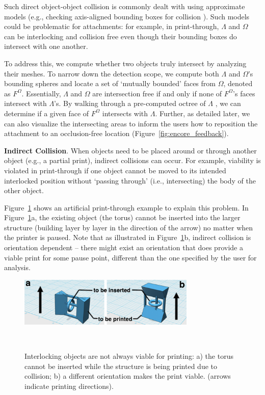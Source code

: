 Such direct object-object collision is commonly dealt with using approximate models (e.g., checking axis-aligned bounding boxes for collision \cite{bergen1997efficient}). Such models could be problematic for attachments: for example, in print-through, $\Lambda$ and $\Omega$ can be interlocking and collision free even though their bounding boxes do intersect with one another.

To address this, we compute whether two objects truly intersect by analyzing their meshes. To narrow down the detection scope, we compute both $\Lambda$ and $\Omega$'s bounding spheres and locate a set of ‘mutually bounded' faces from $\Omega$, denoted as $F^\Omega$. Essentially, $\Lambda$ and $\Omega$ are intersection free if and only if none of $F^\Omega$'s faces intersect with $\Lambda$'s. By walking through a pre-computed octree of $\Lambda$ \cite{meagher1980octree}, we can determine if a given face of $F^\Omega$ intersects with $\Lambda$. Further, as detailed later, we can also visualize the intersecting areas to inform the users how to reposition the attachment to an occlusion-free location (Figure~\ref{fig:encore_feedback}).

\textbf{Indirect Collision}. When objects need to be placed around or through another object (e.g., a partial print), indirect collisions can occur. For example, viability is violated in print-through if one object cannot be moved to its intended interlocked position without ‘passing through' (i.e., intersecting) the body of the other object.

Figure~\ref{fig:encore_interlockable} shows an artificial print-through example to explain this problem. In Figure~\ref{fig:encore_interlockable}a, the existing object (the torus) cannot be inserted into the larger structure (building layer by layer in the direction of the arrow) no matter when the printer is paused. Note that as illustrated in Figure~\ref{fig:encore_interlockable}b, indirect collision is orientation dependent – there might exist an orientation that does provide a viable print for some pause point, different than the one specified by the user for analysis.

\begin{figure}[h]
  \centering
  \includegraphics[width=0.75\textwidth]{figures/encore_interlockable.pdf}
  \caption{Interlocking objects are not always viable for printing: a) the torus cannot be inserted while the structure is being printed due to collision; b) a different orientation makes the print viable. (arrows indicate printing directions).}~\label{fig:encore_interlockable}
\end{figure}

